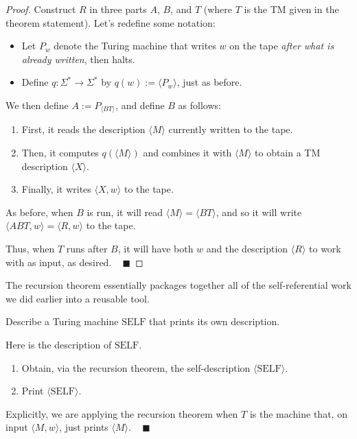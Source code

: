 \begin{proof}
    Construct $R$ in three parts $A$, $B$, and $T$
    (where $T$ is the TM given in the theorem statement).
    Let's redefine some notation:
    \begin{itemize}
        \item Let $P_w$ denote the Turing machine that
        writes $w$ on the tape
        \emph{after what is already written}, then halts.
        \item Define $q \colon \Sigma^* \to \Sigma^*$
        by $q(w) := \langle P_w \rangle$, just as before.
    \end{itemize}
    We then define $A := P_{\langle BT \rangle}$,
    and define $B$ as follows:
    \begin{enumerate}
        \item First, it reads the description $\langle M \rangle$
        currently written to the tape.
        \item Then, it computes $q(\langle M \rangle)$
        and combines it with $\langle M \rangle$
        to obtain a TM description $\langle X \rangle$.
        \item Finally, it writes $\langle X, w \rangle$ to the tape.
    \end{enumerate}
    As before, when $B$ is run,
    it will read $\langle M \rangle = \langle BT \rangle$, and so
    it will write $\langle ABT, w \rangle
    = \langle R, w \rangle$ to the tape.

    Thus, when $T$ runs after $B$,
    it will have both $w$ and the description $\langle R \rangle$
    to work with as input, as desired. ~ $\blacksquare$
\end{proof}

The recursion theorem essentially packages together
all of the self-referential work we did earlier
into a reusable tool.

\begin{problem}
    Describe a Turing machine $\mathrm{SELF}$
    that prints its own description.
\end{problem}

\begin{solution}
    Here is the description of $\mathrm{SELF}$.
    \begin{enumerate}
        \item Obtain, via the recursion theorem,
        the self-description $\langle \mathrm{SELF} \rangle$.
        \item Print $\langle \mathrm{SELF} \rangle$.
    \end{enumerate}
    Explicitly, we are applying the recursion theorem when
    $T$ is the machine that, on input $\langle M, w \rangle$,
    just prints $\langle M \rangle$. ~ $\blacksquare$
\end{solution}

